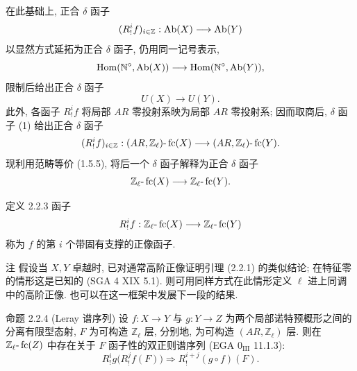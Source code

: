 在此基础上, 正合 \(\delta\) 函子
\[
(R^i_!f)_{i\in\mathbb Z}:\operatorname{Ab}(X)\longrightarrow \operatorname{Ab}(Y)
\]
以显然方式延拓为正合 \(\delta\) 函子, 仍用同一记号表示,
\[
\operatorname{Hom}(\mathbb N^\circ,\operatorname{Ab}(X))\longrightarrow \operatorname{Hom}(\mathbb N^\circ,\operatorname{Ab}(Y)),
\]
限制后给出正合 \(\delta\) 函子
\[
U(X)\longrightarrow U(Y).
\tag{1}
\]
此外, 各函子 \(R^i_!f\) 将局部 \(AR\) 零投射系映为局部 \(AR\) 零投射系; 因而取商后, \(\delta\) 函子 (1) 给出正合 \(\delta\) 函子
\[
(R^i_!f)_{i\in\mathbb Z}:(AR,\mathbb Z_\ell)\text{-}\operatorname{fc}(X)
\longrightarrow (AR,\mathbb Z_\ell)\text{-}\operatorname{fc}(Y).
\]
现利用范畴等价 (1.5.5), 将后一个 \(\delta\) 函子解释为正合 \(\delta\) 函子
\[
\mathbb Z_\ell\text{-}\operatorname{fc}(X)\longrightarrow \mathbb Z_\ell\text{-}\operatorname{fc}(Y).
\]

\begin{statement}{定义 2.2.3}
函子
\[
R^i_!f:\mathbb Z_\ell\text{-}\operatorname{fc}(X)\longrightarrow \mathbb Z_\ell\text{-}\operatorname{fc}(Y)
\]
称为 \(f\) 的第 \(i\) 个带固有支撑的正像函子.
\end{statement}

\begin{statement}{注}
假设当 \(X,Y\) 卓越时, 已对通常高阶正像证明引理 (2.2.1) 的类似结论; 在特征零的情形这是已知的 (SGA 4 XIX 5.1). 则可用同样方式在此情形定义 \(\ell\) 进上同调中的高阶正像. 也可以在这一框架中发展下一段的结果.
\end{statement}

\begin{statement}{命题 2.2.4 (Leray 谱序列)}
设 \(f:X\to Y\) 与 \(g:Y\to Z\) 为两个局部诺特预概形之间的分离有限型态射, \(F\) 为可构造 \(\mathbb Z_\ell\) 层, 分别地, 为可构造 \((AR,\mathbb Z_\ell)\) 层. 则在 \(\mathbb Z_\ell\text{-}\operatorname{fc}(Z)\) 中存在关于 \(F\) 函子性的双正则谱序列 (EGA \(0_{\mathrm{III}}\) 11.1.3):
\[
R^i_!g\bigl(R^j_!f(F)\bigr)\Longrightarrow R^{i+j}_!(g\circ f)(F).
\]
\end{statement}

